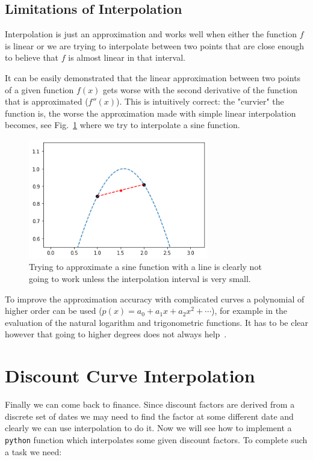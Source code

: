 \subsection{Limitations of Interpolation}
Interpolation is just an approximation and works well when either the function $f$ is linear or we are trying to interpolate between two points that are close enough to believe that $f$ is almost linear in that interval.

It can be easily demonstrated that the linear approximation between two points of a given function $f(x)$ gets worse with the second derivative of the function that is approximated ($f''(x)$). This is intuitively correct: the "curvier" the function is, the worse the approximation made with simple linear interpolation becomes, see Fig.~\ref{fig:sine_interp} where we try to interpolate a sine function.

\begin{figure}
  \centering
  \includegraphics[width=0.7\textwidth]{figures/wrong_interp.png}
  \caption{Trying to approximate a sine function with a line is clearly not going to work unless the interpolation interval is very small.}
  \label{fig:sine_interp}
\end{figure}

To improve the approximation accuracy with complicated curves a polynomial of higher order can be used ($𝑝(𝑥)=𝑎_0 + 𝑎_1 𝑥+ 𝑎_2 𝑥^2+\cdots$), for example in the evaluation of the natural logarithm and trigonometric functions. It has to be clear however that going to higher degrees does not always help~\cite{bib:runge}.

\section{Discount Curve Interpolation}\label{discount-curve-interpolation}

Finally we can come back to finance. Since discount factors are derived from a 
discrete set of dates we may need to find the factor at some different date and 
clearly we can use interpolation to do it.
Now we will see how to implement a \texttt{python} function which interpolates some 
given discount factors.
To complete such a task we need:

